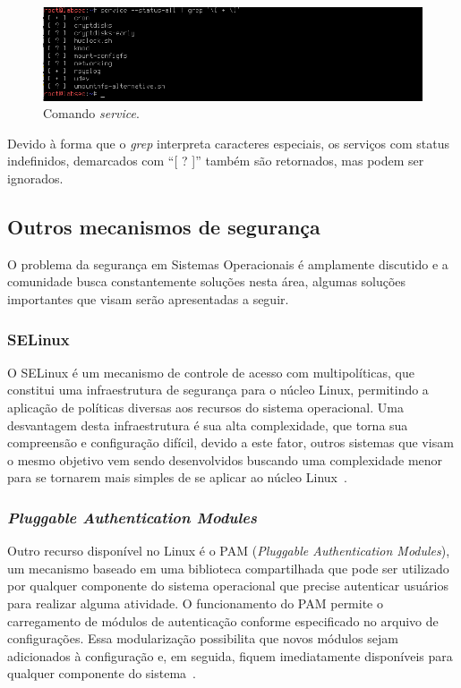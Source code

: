 \documentclass[
    12pt,				%
    oneside,   	        %
    a4paper,			%
    english,			%
    french,				%
    spanish,			%
    brazil,				%
    ]{pacotes/abntex2}
\begin{document}
\begin{figure}[H]
  \centering
  \includegraphics[scale=0.7]{figuras/service.png}
  \caption{Comando \textit{service}.}
  \label{fig:service}
\end{figure}

Devido à forma que o \textit{grep} interpreta caracteres especiais, os serviços com status indefinidos, demarcados com ``[ ? ]'' também são retornados, mas podem ser ignorados.

\subsection{Outros mecanismos de segurança}
O problema da segurança em Sistemas Operacionais é amplamente discutido e a comunidade busca constantemente soluções nesta área, algumas soluções importantes que visam serão apresentadas a seguir.

\subsubsection{SELinux}
O SELinux é um mecanismo de controle de acesso com multipolíticas, que constitui uma infraestrutura de segurança para o núcleo Linux, permitindo a aplicação de políticas diversas aos recursos do sistema operacional. Uma desvantagem desta infraestrutura é sua alta complexidade, que torna sua compreensão e configuração difícil, devido a este fator, outros sistemas que visam o mesmo objetivo vem sendo desenvolvidos buscando uma complexidade menor para se tornarem mais simples de se aplicar ao núcleo Linux~\cite{maziero2019}.

\subsubsection{\textit{Pluggable Authentication Modules}}
Outro recurso disponível no Linux é o PAM (\textit{Pluggable Authentication Modules}), um mecanismo baseado em uma biblioteca compartilhada que pode ser utilizado por qualquer componente do sistema operacional que precise autenticar usuários para realizar alguma atividade. O funcionamento do PAM permite o carregamento de módulos de autenticação conforme especificado no arquivo de configurações. Essa modularização possibilita que novos módulos sejam adicionados à configuração e, em seguida, fiquem imediatamente disponíveis para qualquer componente do sistema~\cite{silberschatz2015}.
\end{document}
